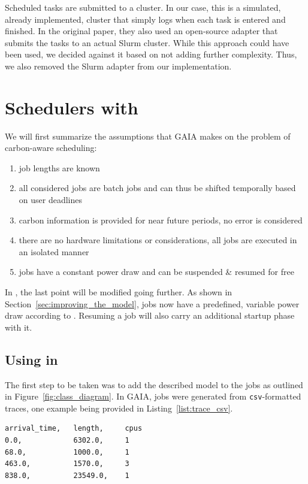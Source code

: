 Scheduled tasks are submitted to a cluster.
In our case, this is a simulated, already implemented, cluster that simply logs when each task is entered and finished. 
In the original paper, they also used an open-source adapter that submits the tasks to an actual Slurm cluster. 
While this approach could have been used, we decided against it based on not adding further complexity. 
Thus, we also removed the Slurm adapter from our implementation.

\chapter{Schedulers with \modelname{}}

We will first summarize the assumptions that GAIA makes on the problem of carbon-aware scheduling:

\begin{enumerate}
    \item job lengths are known
    \item all considered jobs are batch jobs and can thus be shifted temporally based on user deadlines
    \item carbon information is provided for near future periods, no error is considered
    \item there are no hardware limitations or considerations, all jobs are executed in an isolated manner
    \item jobs have a constant power draw and can be suspended \& resumed for free
\end{enumerate}

In \programname{}, the last point will be modified going further. As shown in Section~\ref{sec:improving_the_model}, jobs now have a predefined, variable power draw according to \modelname{}. Resuming a job will also carry an additional startup phase with it.

\section{Using \modelname{} in \programname{}}

The first step to be taken was to add the described model to the jobs as outlined in Figure~\ref{fig:class_diagram}. 
In GAIA, jobs were generated from \verb|csv|-formatted traces, one example being provided in Listing~\ref{list:trace_csv}.

\begin{minipage}{\linewidth}
\begin{lstlisting}[frame=single, numbers=none, caption={Excerpt from the Alibaba-PAI cluster trace}, label={list:trace_csv}, basicstyle=\ttfamily]
arrival_time,   length,     cpus
0.0,            6302.0,     1
68.0,           1000.0,     1
463.0,          1570.0,     3
838.0,          23549.0,    1
\end{lstlisting}
\end{minipage}

